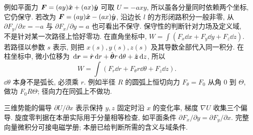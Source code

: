 例如平面力 $\boldsymbol{F}=(ay)\hat{\boldsymbol{x}}+(ax)\hat{\boldsymbol{y}}$ 可取 $U=-axy$, 所以虽各分量同时依赖两个坐标, 它仍保守. 若改为 $\boldsymbol{F}=(ay)\hat{\boldsymbol{x}}-(ax)\hat{\boldsymbol{y}}$, 沿边长 $l$ 的方形闭路积分一般非零, 从 $\partial F_y/\partial x=-a$ 与 $\partial F_x/\partial y=a$ 也可看出不保守. 保守性的判断针对力场及定义域, 不是针对某一次路径上恰好零功.
在直角坐标中, $W=\int(F_x\dd x+F_y\dd y+F_z\dd z)$. 若路径以参数 $s$ 表示, 则把 $x(s),y(s),z(s)$ 及其导数全部代入同一积分. 在柱坐标中, 微小位移为 $\,\mathrm d\boldsymbol{r}=\hat{\boldsymbol{r}}\,\mathrm d r+\hat{\boldsymbol{\theta}} r\,\mathrm d\theta+\hat{\boldsymbol{z}}\,\mathrm d z$, 所以
\begin{equation}
W=\int(F_r\dd r+F_\theta r\dd\theta+F_z\dd z).
\end{equation}
$\dd\theta$ 本身不是弧长, 必须乘 $r$. 例如半径 $R$ 的圆弧上恒切向力 $F_\theta=F_0$ 从角 0 到 $\Theta$, 做功 $F_0R\Theta$; 径向力在同弧上不做功.

三维势能的偏导 $\partial U/\partial x$ 表示保持 $y,z$ 固定时沿 $x$ 的变化率, 梯度 $\nabla U$ 收集三个偏导. 旋度零判据在本册实际用于分量相等检查, 如平面条件 $\partial F_x/\partial y=\partial F_y/\partial x$. 完整向量微积分可接电磁学册; 本册已给判断所需的含义与域条件.
